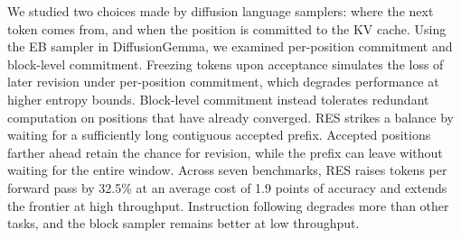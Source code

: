 We studied two choices made by diffusion language samplers: where the next token comes from, and when the position is committed to the KV cache.
Using the EB sampler in DiffusionGemma, we examined per-position commitment and block-level commitment. Freezing tokens upon acceptance simulates the loss of later revision under per-position commitment, which degrades performance at higher entropy bounds. Block-level commitment instead tolerates redundant computation on positions that have already converged.
RES strikes a balance by waiting for a sufficiently long contiguous accepted prefix. Accepted positions farther ahead retain the chance for revision, while the prefix can leave without waiting for the entire window.
Across seven benchmarks, RES raises tokens per forward pass by 32.5\% at an average cost of 1.9 points of accuracy and extends the frontier at high throughput. Instruction following degrades more than other tasks, and the block sampler remains better at low throughput.
